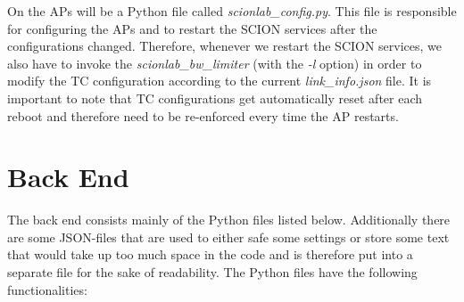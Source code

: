 On the \aclp{AP} will be a Python file called \textit{scionlab\_config.py}. This file is responsible for configuring the \acsp{AP} and to restart the \acs{SCION} services after the configurations changed. Therefore, whenever we restart the \acs{SCION} services, we also have to invoke the \textit{scionlab\_bw\_limiter} (with the \textit{-l} option) in order to modify the \acs{TC} configuration according to the current \textit{link\_info.json} file. It is important to note that \acs{TC} configurations get automatically reset after each reboot and therefore need to be re-enforced every time the \acs{AP} restarts.

\section{Back End}

The back end consists mainly of the Python files listed below. Additionally there are some \acs{JSON}-files that are used to either safe some settings or store some text that would take up too much space in the code and is therefore put into a separate file for the sake of readability. The Python files have the following functionalities:

